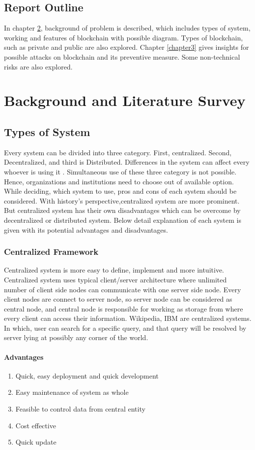 \documentclass[a4paper,twoside,12pt]{report}
\begin{document}
\begin{spacing}{1.5}
\section{Report Outline}
In chapter \ref{chapter2}, background of problem is described, which includes types of system, working and features of blockchain with possible diagram. Types of blockchain, such as private and public are also explored. Chapter \ref{chapter3} gives insights for possible attacks on blockchain and its preventive measure. Some non-technical risks are also explored.
\chapter{Background and Literature Survey}
\label{chapter2}
\section{Types of System}
Every system can be divided into three category. First, centralized. Second, Decentralized, and third is Distributed. Differences in the system can affect every whoever is using it \cite{gfg_cent_vs_decent}. Simultaneous use of these three category is not possible. Hence, organizations and institutions need to choose out of available option. While deciding, which system to use, pros and cons of each system should be considered. With history's perspective,centralized system are more prominent. But centralized system has their own disadvantages which can be overcome by decentralized or distributed system. Below detail explanation of each system is given with its potential advantages and disadvantages.
\subsection{Centralized Framework}
Centralized system is more easy to define, implement and more intuitive. Centralized system uses typical client/server architecture where unlimited number of client side nodes can communicate with one server side node. Every client nodes are connect to server node, so server node can be considered as central node, and central node is responsible for working as storage from where every client can access their information. 
Wikipedia, IBM are centralized systems. In which, user can search for a specific query, and that query will be resolved by server lying at possibly any corner of the world.
\subsubsection{Advantages}
\begin{enumerate}
\item{Quick, easy deployment and quick development}
\item{Easy maintenance of system as whole}
\item{Feasible to control data from central entity}
\item{Cost effective}
\item{Quick update}
\end{enumerate}

\end{spacing}
\end{document}
